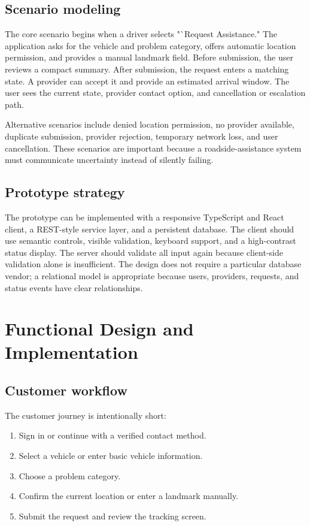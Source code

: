 \documentclass[conference]{IEEEtran}
\begin{document}
\subsection{Scenario modeling}
The core scenario begins when a driver selects "`Request Assistance." The application asks for the vehicle and problem category, offers automatic location permission, and provides a manual landmark field. Before submission, the user reviews a compact summary. After submission, the request enters a matching state. A provider can accept it and provide an estimated arrival window. The user sees the current state, provider contact option, and cancellation or escalation path.

Alternative scenarios include denied location permission, no provider available, duplicate submission, provider rejection, temporary network loss, and user cancellation. These scenarios are important because a roadside-assistance system must communicate uncertainty instead of silently failing.

\subsection{Prototype strategy}
The prototype can be implemented with a responsive TypeScript and React client, a REST-style service layer, and a persistent database. The client should use semantic controls, visible validation, keyboard support, and a high-contrast status display. The server should validate all input again because client-side validation alone is insufficient. The design does not require a particular database vendor; a relational model is appropriate because users, providers, requests, and status events have clear relationships.

\section{Functional Design and Implementation}

\subsection{Customer workflow}
The customer journey is intentionally short:
\begin{enumerate}
    \item Sign in or continue with a verified contact method.
    \item Select a vehicle or enter basic vehicle information.
    \item Choose a problem category.
    \item Confirm the current location or enter a landmark manually.
    \item Submit the request and review the tracking screen.
\end{enumerate}
\end{document}
